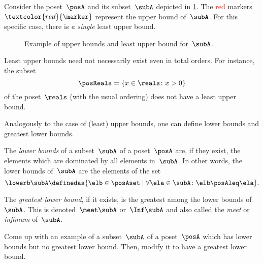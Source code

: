 \begin{example}
	Consider the poset~$\posA$ and its subset~$\subA$ depicted in \cref{fig:upper_bound_example_bis}.
	The \textcolor{red}{red} markers~$\textcolor{red}{\marker}$ represent the upper bound of~$\subA$.
	For this specific case, there is \emph{a single} least upper bound.
\end{example}

\begin{figure}[h!]
	\begin{center}
	\end{center}
	\caption{Example of upper bounds and least upper bound for~$\subA$.  \label{fig:upper_bound_example_bis}}
\end{figure}
\begin{example}
	Least upper bounds need not necessarily exist even in total orders.
	For instance, the subset
	\begin{equation*}
		\posReals = \{x\in \reals \colon x>0\}
	\end{equation*}
	of the poset~$\reals$ (with the usual ordering) does not have a least upper bound.
\end{example}

Analogously to the case of (least) upper bounds, one can define lower bounds and greatest lower bounds.

\begin{ctdefinition}
	\label{def:greatest-lower-bound}
	The \emph{lower bounds} of a subset~$\subA$ of a poset~$\posA$ are, if they exist, the elements which are dominated by all elements in~$\subA$.
	In other words, the lower bounds of~$\subA$ are the elements of the set
	\begin{equation*}
		\lowerb \subA\definedas \{ \elb \in \posAset \mid \forall \ela \in \subA  \colon \elb \posAleq \ela \}.
	\end{equation*}
\end{ctdefinition}

\begin{ctdefinition}
	The \emph{greatest lower bound}, if it exists, is the greatest among the lower bounds of~$\subA$.
	This is denoted~$\meet \subA$ or~$\Inf \subA$ and also called the \emph{meet} or \emph{infimum} of~$\subA$.
\end{ctdefinition}

\begin{exercise}
	Come up with an example of a subset~$\subA$ of a poset~$\posA$ which has lower bounds but no greatest lower bound.
	Then, modify it to have a greatest lower bound.
\end{exercise}

